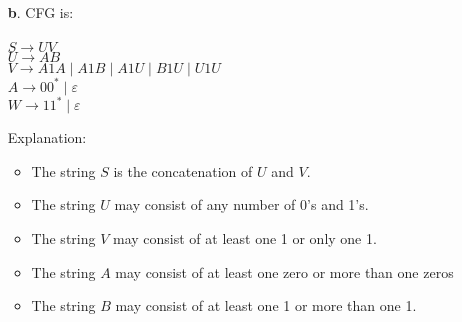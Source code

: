 \documentclass[12pt]{letter}
\begin{document}
\begin{enumerate}
\begin{center}
	\end{center}
\item[\textbf{b}.]CFG is: \\
		\leavevmode \\
	\setlength\parindent{100pt} 
	$S \rightarrow UV$\\
	$U \rightarrow AB$ \\
	$V \rightarrow A1A \mid A1B \mid A1U \mid B1U \mid U1U$\\
	$A \rightarrow 00^* \mid \varepsilon$\\
	$W \rightarrow 11^* \mid \varepsilon$\\
	\setlength\parindent{0pt} 

Explanation:\\
	\begin{itemize}
		\item The string $S$ is the concatenation of $U$ and $V$.
		\item The string $U$ may consist of any number of 0's and 1's.
		\item The string $V$ may consist of at least one 1 or only one 1.
		\item The string $A$ may consist of at least one zero or more than one zeros
		\item The string $B$ may consist of at least one 1 or more than one 1.
	\end{itemize}
\end{enumerate}
\end{document}
